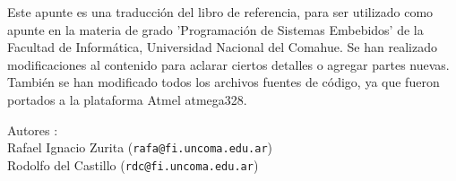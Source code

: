\documentclass[12pt]{article}
\begin{document}
Este apunte es una traducción del libro de referencia, para
ser utilizado como apunte en la materia de grado
'Programación de Sistemas Embebidos' de la Facultad de Informática,
Universidad Nacional del Comahue.
Se han realizado modificaciones
al contenido para aclarar ciertos detalles o agregar partes nuevas.
 También se han
modificado todos los archivos fuentes de código, ya que fueron
portados a la plataforma Atmel atmega328.

Autores : \\
Rafael Ignacio Zurita ({\tt rafa@fi.uncoma.edu.ar}) \\
Rodolfo del Castillo ({\tt rdc@fi.uncoma.edu.ar})




\end{document}

